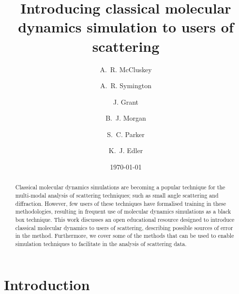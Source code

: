 \documentclass[amsmath,amssymb,twocolumn,superscriptaddress,aps,prl]{revtex4-1}
\begin{document}

\title{Introducing classical molecular dynamics simulation to users of
scattering}

\author{A.~R. McCluskey}

\author{A.~R. Symington}

\author{J. Grant}

\author{B.~J. Morgan}

\author{S.~C. Parker}

\author{K.~J. Edler}

\date{\today}

\begin{abstract}
Classical molecular dynamics simulations are becoming a popular technique for the multi-modal analysis of scattering techniques; such as small angle scattering and diffraction.
However, few users of these techniques have formalised training in these methodologies, resulting in frequent use of molecular dynamics simulations as a black box technique.
This work discusses an open educational resource designed to introduce classical molecular dynamics to users of scattering, describing possible sources of error in the method.
Furthermore, we cover some of the methods that can be used to enable simulation techniques to facilitate in the analysis of scattering data.
\end{abstract}

\maketitle                        %

\section{Introduction}
\end{document}
